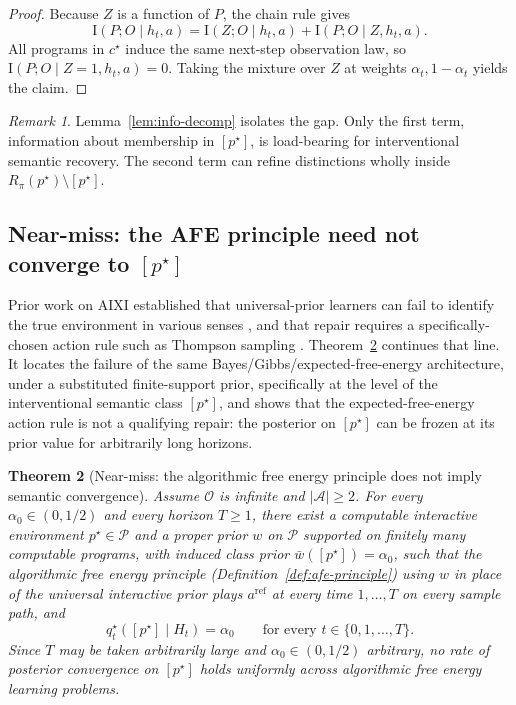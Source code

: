 \documentclass[11pt]{article}
\newtheorem{theorem}{Theorem}[section]
\theoremstyle{definition}
\theoremstyle{remark}
\newtheorem{remark}[theorem]{Remark}
\newcommand{\Acal}{\mathcal{A}}
\newcommand{\Ocal}{\mathcal{O}}
\newcommand{\Pcal}{\mathcal{P}}
\newcommand{\I}{\mathrm{I}}
\begin{document}
\begin{proof}
Because $Z$ is a function of $P$, the chain rule gives
\[
\I(P;O\mid h_t,a)=\I(Z;O\mid h_t,a)+\I(P;O\mid Z,h_t,a).
\]
All programs in $c^\star$ induce the same next-step observation law, so $\I(P;O\mid Z=1,h_t,a)=0$. Taking the mixture over $Z$ at weights $\alpha_t,1-\alpha_t$ yields the claim.
\end{proof}

\begin{remark}
Lemma~\ref{lem:info-decomp} isolates the gap. Only the first term, information about membership in $[p^\star]$, is load-bearing for interventional semantic recovery. The second term can refine distinctions wholly inside $R_\pi(p^\star)\setminus[p^\star]$.
\end{remark}

\subsection{Near-miss: the AFE principle need not converge to $[p^\star]$}

Prior work on AIXI established that universal-prior learners can fail to identify the true environment in various senses \citep{LeikeHutter2015,Leike2016}, and that repair requires a specifically-chosen action rule such as Thompson sampling \citep{LeikeEtAl2016}. Theorem~\ref{thm:afe-near-miss} continues that line. It locates the failure of the same Bayes/Gibbs/expected-free-energy architecture, under a substituted finite-support prior, specifically at the level of the interventional semantic class $[p^\star]$, and shows that the expected-free-energy action rule is not a qualifying repair: the posterior on $[p^\star]$ can be frozen at its prior value for arbitrarily long horizons.

\begin{theorem}[Near-miss: the algorithmic free energy principle does not imply semantic convergence]
\label{thm:afe-near-miss}
Assume $\Ocal$ is infinite and $|\Acal|\ge 2$. For every $\alpha_0\in(0,1/2)$ and every horizon $T\ge 1$, there exist a computable interactive environment $p^\star\in\Pcal$ and a proper prior $w$ on $\Pcal$ supported on finitely many computable programs, with induced class prior $\bar w([p^\star])=\alpha_0$, such that the algorithmic free energy principle (Definition~\ref{def:afe-principle}) using $w$ in place of the universal interactive prior plays $a^{\mathrm{ref}}$ at every time $1,\dots,T$ on every sample path, and
\[
q_t^\star([p^\star]\mid H_t)=\alpha_0
\qquad\text{for every }t\in\{0,1,\dots,T\}.
\]
Since $T$ may be taken arbitrarily large and $\alpha_0\in(0,1/2)$ arbitrary, no rate of posterior convergence on $[p^\star]$ holds uniformly across algorithmic free energy learning problems.
\end{theorem}
\end{document}
